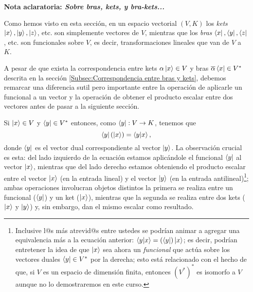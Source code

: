 \documentclass[12pt,libertine]{book}
\begin{document}
\newpage
\begin{tcolorbox}
\begin{center}
    \textbf{Nota aclaratoria: \emph{Sobre bras, kets, y bra-kets...}}
\end{center}

\hspace{3mm} Como hemos visto en esta sección, en un espacio vectorial $(V,K)$ los \emph{kets} $\ket{x},\ket{y},\ket{z}$, etc. son simplemente vectores de $V$, mientras que los \emph{bras} $\bra{x},\bra{y},\bra{z}$, etc. son funcionales sobre $V$, es decir, transformaciones lineales que van de $V$ a $K$.

\vspace{5mm}
\hspace{3mm} A pesar de que exista la correspondencia entre kets $\alpha\ket{x}\in V$ y bras $\overline{\alpha}\bra{x}\in V^*$ descrita en la sección \ref{Subsec:Correspondencia entre bras y kets}, debemos remarcar una diferencia sutil pero importante entre la operación de aplicarle un funcional a un vector y la operación de obtener el producto escalar entre dos vectores antes de pasar a la siguiente sección.

\vspace{5mm}
\hspace{3mm} Si $\ket{x}\in V$ y $\bra{y}\in V^*$ entonces, como $\bra{y}:V\to K$, tenemos que $$\bra{y}(\ket{x}) = \braket{y|x},$$ donde $\bra{y}$ es el vector dual correspondiente al vector $\ket{y}$. La observación crucial es esta: del lado izquierdo de la ecuación estamos aplicándole el funcional $\bra{y}$ al vector $\ket{x}$, mientras que del lado derecho estamos obteniendo el producto escalar entre el vector $\ket{x}$ (en la entrada lineal) y el vector $\ket{y}$ (en la entrada antilineal)\footnote{Inclusive l@s más atrevid@s entre ustedes se podrían animar a agregar una equivalencia más a la ecuación anterior: $\braket{y|x}=(\bra{y})\ket{x}$; es decir, podrían entretener la idea de que $\ket{x}$ sea ahora un \emph{funcional} que actúa sobre los vectores duales $\bra{y}\in V^*$ por la derecha; esto está relacionado con el hecho de que, si $V$ es un espacio de dimensión finita, entonces $(V^*)^*$ es isomorfo a $V$ \textemdash aunque no lo demostraremos en este curso.}; ambas operaciones involucran objetos distintos \textemdash la primera se realiza entre un funcional ($\bra{y}$) y un ket ($\ket{x}$), mientras que la segunda se realiza entre dos kets ($\ket{x}$ y $\ket{y}$)\textemdash\hspace{1mm} y, sin embargo, dan el mismo escalar como resultado.

\vspace{5mm}

\end{tcolorbox}
\end{document}
